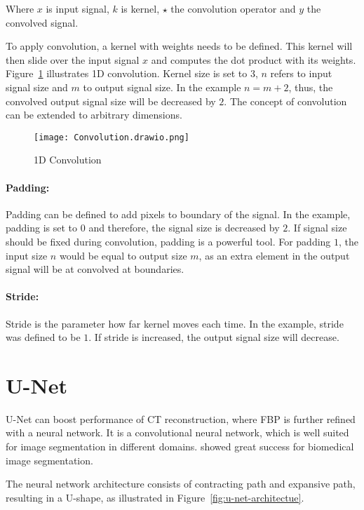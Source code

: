 Where $x$ is input signal, $k$ is kernel, $\star$ the convolution operator and $y$ the convolved signal.

To apply convolution, a kernel with weights needs to be defined. 
This kernel will then slide over the input signal $x$ and computes the dot product with its weights.
Figure~\ref{fig:1d-convolution} illustrates 1D convolution. Kernel size is set to 3, $n$ refers to input signal size and $m$ to output signal size.
In the example  $ n = m + 2$, thus, the convolved output signal size will be decreased by $2$.
The concept of convolution can be extended to arbitrary dimensions.

\begin{figure}[H]
  \centering
  \texttt{[image: Convolution.drawio.png]}
  \caption{1D Convolution}
  \label{fig:1d-convolution}
\end{figure}

\paragraph{Padding:} 


Padding can be defined to add pixels to boundary of the signal.
In the example, padding is set to $0$ and therefore, the signal size is decreased by $2$.
If signal size should be fixed during convolution, padding is a powerful tool. For padding $1$,
the input size $n$ would be equal to output size $m$, as an extra element in the output signal
will be at convolved at boundaries.


\paragraph{Stride:}
Stride is the parameter how far kernel moves each time. In the example, stride was defined to be $1$.
If stride is increased, the output signal size will decrease.

\section{U-Net}
\label{sec:unet}
U-Net can boost performance of CT reconstruction, where FBP is further refined with a neural network.
It is a convolutional neural network, which is well suited for image segmentation in different domains.
\cite{unet-tomography} showed great success for biomedical image segmentation.

The neural network architecture consists of contracting path and expansive path,
resulting in a U-shape, as illustrated in Figure~\ref{fig:u-net-architectue}.

